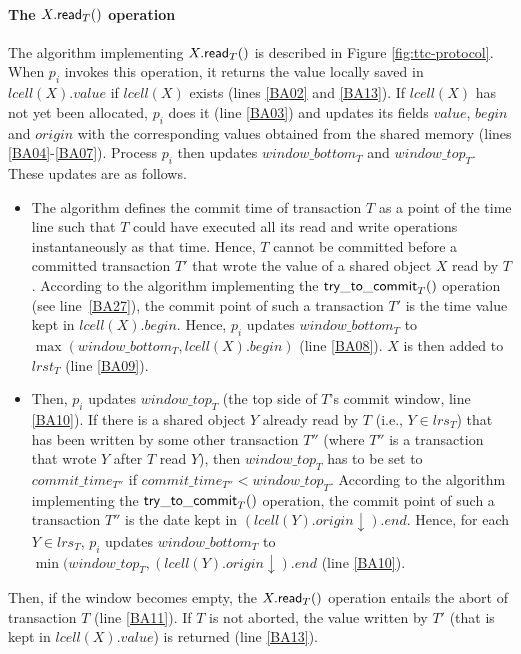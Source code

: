\paragraph{The  $X.{\sf read}_T()$ operation}
The algorithm implementing $X.{\sf read}_T()$ is described in Figure
\ref{fig:ttc-protocol}.  When $p_i$ invokes this operation, it 
returns the value locally saved in $lcell(X).value$ if  $lcell(X)$ exists
(lines  \ref{BA02} and \ref{BA13}). 
%
If  $lcell(X)$ has not yet been allocated, $p_i$ does it (line \ref{BA03}) and 
updates its  fields $value$, $begin$  and  $origin$ with the corresponding 
values obtained from the shared memory (lines \ref{BA04}-\ref{BA07}).
%
Process $p_i$ then updates $window\_bottom_T$ and $window\_top_T$.
These updates are as follows. 
\begin{itemize}  
%
\vspace{-0.2cm}
\item 
The algorithm defines the  commit time of transaction $T$ as a point of the  
time line such that $T$ could have executed all its read and write operations 
instantaneously as that time. Hence, $T$ cannot be committed before
a committed transaction $T'$  that wrote the value of a shared object $X$  
read by $T$. 
According to the algorithm implementing the ${\sf try\_to\_commit}_T()$ 
operation  (see line~\ref{BA27}), 
the commit point of such a transaction $T'$ is  the time value kept in 
$lcell(X).begin$. Hence, $p_i$ updates  $window\_bottom_T$ to 
$\max(window\_bottom_T, lcell(X).begin)$ (line  \ref{BA08}).
$X$ is then added to $lrst_T$  (line  \ref{BA09}).
%
%
\vspace{-0.2cm}
\item 
Then, $p_i$ updates  $window\_top_T$ (the top side of $T$'s  commit window,
line \ref{BA10}). 
If there is a shared object $Y$ already read by $T$  (i.e., $Y\in lrs_T$)
that has been written by some  other transaction $T''$ 
(where $T''$ is a transaction that  wrote  $Y$ after $T$ read $Y$),   
then $window\_top_T$ has to be set to  $commit\_time_{T''}$  
if  $commit\_time_{T''} <window\_top_T$.
%
According to the algorithm implementing the ${\sf try\_to\_commit}_T()$ 
operation,  
the commit point of such a transaction $T''$ is  the date kept in 
$(lcell(Y).origin\downarrow).\mathit{end}$. 
 Hence, for each $Y \in lrs_T$, $p_i$ updates  $window\_bottom_T$ to 
$\min\big(window\_top_T, (lcell(Y).origin\downarrow).\mathit{end}$
(line  \ref{BA10}).
\end{itemize}
Then, if the window becomes empty, the  $X.{\sf read}_T()$ operation 
entails the abort of transaction $T$ (line  \ref{BA11}).
If $T$ is not aborted, the value written  by $T'$ (that is  
kept in  $lcell(X).value$) is returned (line  \ref{BA13}). 




